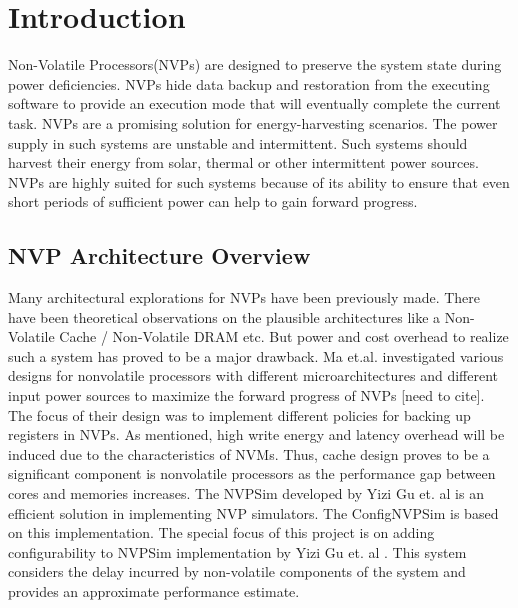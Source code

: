 \documentclass[conference]{IEEEtran}
\begin{document}
\section{ \textbf{Introduction}}
Non-Volatile Processors(NVPs) are designed to preserve the system state during power deficiencies. NVPs hide data backup and restoration from the executing software to provide an execution mode that will  eventually complete the current task. NVPs are a promising solution for energy-harvesting scenarios. The power supply in such systems are unstable and intermittent. Such systems should harvest their energy from solar, thermal or other intermittent power sources. NVPs are highly suited for such systems because of its ability to ensure that even short periods of sufficient power can help to gain forward progress. 
\subsection{NVP Architecture Overview}
 Many architectural explorations for NVPs have been previously made. There have been theoretical observations on the plausible architectures like a Non-Volatile Cache / Non-Volatile DRAM etc. But power and cost overhead to realize such a system has proved to be a major drawback. Ma et.al. investigated various designs for nonvolatile processors with different microarchitectures and different input power sources to maximize the forward progress of NVPs [need to cite]. The focus of their design was to implement different policies for backing up registers in NVPs. As mentioned, high write energy and latency overhead will be induced due to the characteristics of NVMs. Thus, cache design proves to be a significant component is nonvolatile processors as the performance gap between cores and memories increases. The NVPSim developed by Yizi Gu et. al is an efficient solution in implementing NVP simulators. The ConfigNVPSim is based on this implementation. The special focus of this project is on adding configurability to NVPSim implementation by Yizi Gu et. al \cite{b1}. This system considers the delay incurred by non-volatile components of the system and provides an approximate performance estimate.
\end{document}
